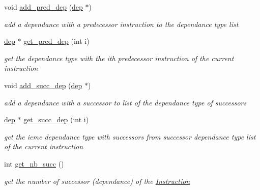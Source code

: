 \begin{DoxyCompactItemize}
\mbox{\label{class_instruction_a3121dad231e2b4c27ac3cae6c8627ece}} 
void \mbox{\hyperlink{class_instruction_a3121dad231e2b4c27ac3cae6c8627ece}{add\+\_\+pred\+\_\+dep}} (\mbox{\hyperlink{structdep}{dep}} $\ast$)
\begin{DoxyCompactList}\small\item\em add a dependance with a predecessor instruction to the dependance type list \end{DoxyCompactList}\item 
\mbox{\label{class_instruction_ab32531f8dd490b1c8396b6723f87bfae}} 
\mbox{\hyperlink{structdep}{dep}} $\ast$ \mbox{\hyperlink{class_instruction_ab32531f8dd490b1c8396b6723f87bfae}{get\+\_\+pred\+\_\+dep}} (int i)
\begin{DoxyCompactList}\small\item\em get the dependance type with the ith predecessor instruction of the current instruction \end{DoxyCompactList}\item 
\mbox{\label{class_instruction_acefc258dbcf45c19136dc86e47a82c0e}} 
void \mbox{\hyperlink{class_instruction_acefc258dbcf45c19136dc86e47a82c0e}{add\+\_\+succ\+\_\+dep}} (\mbox{\hyperlink{structdep}{dep}} $\ast$)
\begin{DoxyCompactList}\small\item\em add a dependance with a successor to list of the dependance type of successors \end{DoxyCompactList}\item 
\mbox{\label{class_instruction_ad3bb47ea5f9e4b975e0191d6c96ffc30}} 
\mbox{\hyperlink{structdep}{dep}} $\ast$ \mbox{\hyperlink{class_instruction_ad3bb47ea5f9e4b975e0191d6c96ffc30}{get\+\_\+succ\+\_\+dep}} (int i)
\begin{DoxyCompactList}\small\item\em get the ieme dependance type with successors from successor dependance type list of the current instruction \end{DoxyCompactList}\item 
\mbox{\label{class_instruction_ab2d8c29efa78ec3c1a70f154a8c2f068}} 
int \mbox{\hyperlink{class_instruction_ab2d8c29efa78ec3c1a70f154a8c2f068}{get\+\_\+nb\+\_\+succ}} ()
\begin{DoxyCompactList}\small\item\em get the number of successor (dependance) of the \mbox{\hyperlink{class_instruction}{Instruction}} \end{DoxyCompactList}\item 

\end{DoxyCompactItemize}
